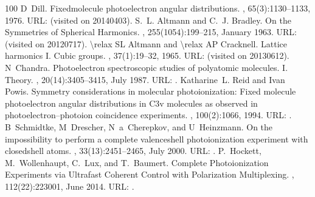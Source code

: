 \documentclass[letterpaper,table,10pt,english]{jupyterBook}
\begin{document}
\begin{sphinxthebibliography}{100}
D Dill. Fixed\sphinxhyphen{}molecule photoelectron angular distributions. , 65(3):1130–1133, 1976. URL:  (visited on 2014\sphinxhyphen{}04\sphinxhyphen{}03).
\sphinxAtStartPar
S. L. Altmann and C. J. Bradley. On the Symmetries of Spherical Harmonics. , 255(1054):199–215, January 1963. URL:  (visited on 2012\sphinxhyphen{}07\sphinxhyphen{}17).
\sphinxAtStartPar
\textbackslash{}relax SL Altmann and \textbackslash{}relax AP Cracknell. Lattice harmonics I. Cubic groups. , 37(1):19–32, 1965. URL:  (visited on 2013\sphinxhyphen{}06\sphinxhyphen{}12).
\sphinxAtStartPar
N Chandra. Photoelectron spectroscopic studies of polyatomic molecules. I. Theory. , 20(14):3405–3415, July 1987. URL: .
\sphinxAtStartPar
Katharine L. Reid and Ivan Powis. Symmetry considerations in molecular photoionization: Fixed molecule photoelectron angular distributions in C3v molecules as observed in photoelectron–photoion coincidence experiments. , 100(2):1066, 1994. URL: .
\sphinxAtStartPar
{}
\sphinxAtStartPar
B Schmidtke, M Drescher, N a Cherepkov, and U Heinzmann. On the impossibility to perform a complete valence\sphinxhyphen{}shell photoionization experiment with closed\sphinxhyphen{}shell atoms. , 33(13):2451–2465, July 2000. URL: .
\sphinxAtStartPar
P. Hockett, M. Wollenhaupt, C. Lux, and T. Baumert. Complete Photoionization Experiments via Ultrafast Coherent Control with Polarization Multiplexing. , 112(22):223001, June 2014. URL: .

\end{sphinxthebibliography}
\end{document}

